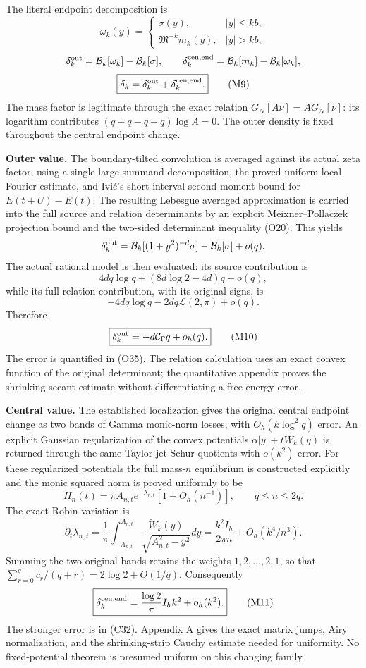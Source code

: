 The literal endpoint decomposition is \[
\omega_k(y)=
\begin{cases}\sigma(y),&|y|\le kb,\\
\mathfrak M^{-k}m_k(y),&|y|>kb,
\end{cases}
\] \[
\delta_k^{\rm out}=\mathcal B_k[\omega_k]-\mathcal B_k[\sigma],\qquad
\delta_k^{\rm cen,end}=\mathcal B_k[m_k]-\mathcal B_k[\omega_k],
\] \[
\boxed{\delta_k=\delta_k^{\rm out}+\delta_k^{\rm cen,end}.}\tag{M9}
\] The mass factor is legitimate through the exact relation
\(G_N[A\nu]=AG_N[\nu]\): its logarithm contributes
\((q+q-q-q)\log A=0\). The outer density is fixed throughout the central
endpoint change.

\textbf{Outer value.} The boundary-tilted convolution is averaged
against its actual zeta factor, using a single-large-summand
decomposition, the proved uniform local Fourier estimate, and Ivić's
short-interval second-moment bound for \(E(t+U)-E(t)\). The resulting
Lebesgue averaged approximation is carried into the full source and
relation determinants by an explicit Meixner--Pollaczek projection bound
and the two-sided determinant inequality (O20). This yields \[
\delta_k^{\rm out}
=\mathcal B_k[(1+y^2)^{-d}\sigma]-\mathcal B_k[\sigma]+o(q).
\] The actual rational model is then evaluated: its source contribution
is \[
4dq\log q+(8d\log2-4d)q+o(q),
\] while its full relation contribution, with its original signs, is \[
-4dq\log q-2dq\mathcal L(2,\pi)+o(q).
\] Therefore \[
\boxed{\delta_k^{\rm out}=-d\mathcal C_\Gamma q+o_h(q).}\tag{M10}
\] The error is quantified in (O35). The relation calculation uses an
exact convex function of the original determinant; the quantitative
appendix proves the shrinking-secant estimate without differentiating a
free-energy error.

\textbf{Central value.} The established localization gives the original
central endpoint change as two bands of Gamma monic-norm losses, with
\(O_h(k\log^2q)\) error. An explicit Gaussian regularization of the
convex potentials \(\alpha|y|+tW_k(y)\) is returned through the same
Taylor-jet Schur quotients with \(o(k^2)\) error. For these regularized
potentials the full mass-\(n\) equilibrium is constructed explicitly and
the monic squared norm is proved uniformly to be \[
H_n(t)=\pi A_{n,t}e^{-\lambda_{n,t}}[1+O_h(n^{-1})],
\qquad q\le n\le2q.
\] The exact Robin variation is \[
\partial_t\lambda_{n,t}
=\frac1\pi\int_{-A_{n,t}}^{A_{n,t}}
\frac{\widetilde W_k(y)}{\sqrt{A_{n,t}^2-y^2}}dy
=\frac{k^2I_h}{2\pi n}+O_h(k^4/n^3).
\] Summing the two original bands retains the weights
\(1,2,\ldots,2,1\), so that \(\sum_{r=0}^q c_r/(q+r)=2\log2+O(1/q)\).
Consequently \[
\boxed{\delta_k^{\rm cen,end}
=\frac{\log2}{\pi}I_hk^2+o_h(k^2).}\tag{M11}
\] The stronger error is in (C32). Appendix A gives the exact matrix
jumps, Airy normalization, and the shrinking-strip Cauchy estimate
needed for uniformity. No fixed-potential theorem is presumed uniform on
this changing family.

